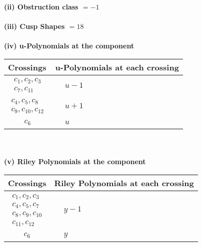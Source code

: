 \documentclass[1p]{elsarticle_modified}
\theoremstyle{definition}
\begin{document}
\flushleft \textbf{(ii) Obstruction class $= -1$}\\~\\
\flushleft \textbf{(iii) Cusp Shapes $= 18$}\\~\\
\newpage\renewcommand{\arraystretch}{1}
\flushleft \textbf{(iv) u-Polynomials at the component}\newline \\
\begin{tabular}{m{50pt}|m{274pt}}
Crossings & \hspace{64pt}u-Polynomials at each crossing \\
\hline $$\begin{aligned}c_{1},c_{2},c_{3}\\c_{7},c_{11}\end{aligned}$$&$\begin{aligned}
&u-1
\end{aligned}$\\
\hline $$\begin{aligned}c_{4},c_{5},c_{8}\\c_{9},c_{10},c_{12}\end{aligned}$$&$\begin{aligned}
&u+1
\end{aligned}$\\
\hline $$\begin{aligned}c_{6}\end{aligned}$$&$\begin{aligned}
&u
\end{aligned}$\\
\hline
\end{tabular}\\~\\
\newpage\renewcommand{\arraystretch}{1}
\flushleft \textbf{(v) Riley Polynomials at the component}\newline \\
\begin{tabular}{m{50pt}|m{274pt}}
Crossings & \hspace{64pt}Riley Polynomials at each crossing \\
\hline $$\begin{aligned}c_{1},c_{2},c_{3}\\c_{4},c_{5},c_{7}\\c_{8},c_{9},c_{10}\\c_{11},c_{12}\end{aligned}$$&$\begin{aligned}
&y-1
\end{aligned}$\\
\hline $$\begin{aligned}c_{6}\end{aligned}$$&$\begin{aligned}
&y
\end{aligned}$\\
\hline
\end{tabular}\\~\\
\end{document}
